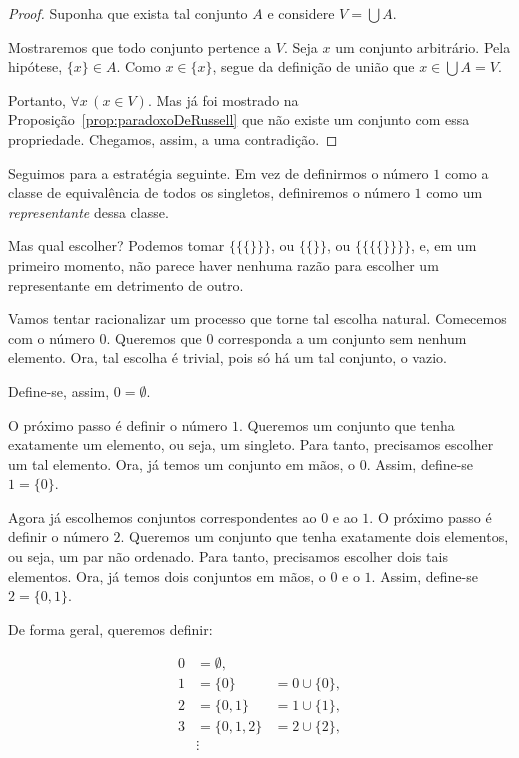 \begin{proof}
    Suponha que exista tal conjunto $A$ e considere $V=\bigcup A$.

    Mostraremos que todo conjunto pertence a $V$.
    Seja $x$ um conjunto arbitrário.
    Pela hipótese, $\{x\}\in A$.
    Como $x\in\{x\}$, segue da definição de união que $x\in\bigcup A=V$.

    Portanto, $\forall x\, (x\in V)$.
    Mas já foi mostrado na Proposição~\ref{prop:paradoxoDeRussell} que não existe um conjunto com essa propriedade.
    Chegamos, assim, a uma contradição.
\end{proof}

Seguimos para a estratégia seguinte.
Em vez de definirmos o número $1$ como a classe de equivalência de todos os singletos, definiremos o número $1$ como um \emph{representante} dessa classe.

Mas qual escolher?
Podemos tomar $\{\{\{\}\}\}$, ou $\{\{\}\}$, ou $\{\{\{\{\}\}\}\}$, e, em um primeiro momento, não parece haver nenhuma razão para escolher um representante em detrimento de outro.

Vamos tentar racionalizar um processo que torne tal escolha natural.
Comecemos com o número $0$.
Queremos que $0$ corresponda a um conjunto sem nenhum elemento.
Ora, tal escolha é trivial, pois só há um tal conjunto, o vazio.

Define-se, assim, $0=\emptyset$.

O próximo passo é definir o número $1$.
Queremos um conjunto que tenha exatamente um elemento, ou seja, um singleto.
Para tanto, precisamos escolher um tal elemento.
Ora, já temos um conjunto em mãos, o $0$. Assim, define-se $1=\{0\}$.

Agora já escolhemos conjuntos correspondentes ao $0$ e ao $1$.
O próximo passo é definir o número $2$.
Queremos um conjunto que tenha exatamente dois elementos, ou seja, um par não ordenado. Para tanto, precisamos escolher dois tais elementos.
Ora, já temos dois conjuntos em mãos, o $0$ e o $1$. Assim, define-se $2=\{0,1\}$.

De forma geral, queremos definir:

\begin{align*}
    0 &= \emptyset,\\
    1 &= \{0\} &= 0 \cup \{0\},\\
    2 &= \{0,1\} &= 1 \cup \{1\},\\
    3 &= \{0,1,2\} &= 2 \cup \{2\},\\
     &\vdots
\end{align*}

